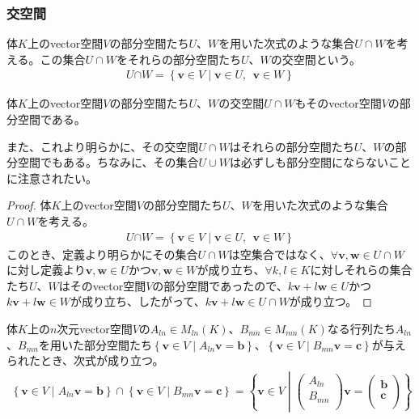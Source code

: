 \documentclass[dvipdfmx]{jsarticle}
\begin{document}
\subsubsection{交空間}%
\begin{dfn}
体$K$上のvector空間$V$の部分空間たち$U$、$W$を用いた次式のような集合$U \cap W$を考える。この集合$U \cap W$をそれらの部分空間たち$U$、$W$の交空間という。
\begin{align*}
U\text{∩}W = \left\{ \mathbf{v} \in V \middle| \mathbf{v} \in U,\ \ \mathbf{v} \in W \right\}
\end{align*}
\end{dfn}
\begin{thm}\label{2.1.9.3}
体$K$上のvector空間$V$の部分空間たち$U$、$W$の交空間$U \cap W$もそのvector空間$V$の部分空間である。
\end{thm}\par
また、これより明らかに、その交空間$U \cap W$はそれらの部分空間たち$U$、$W$の部分空間でもある。ちなみに、その集合$U \cup W$は必ずしも部分空間にならないことに注意されたい。
\begin{proof}
体$K$上のvector空間$V$の部分空間たち$U$、$W$を用いた次式のような集合$U \cap W$を考える。
\begin{align*}
U\text{∩}W = \left\{ \mathbf{v} \in V \middle| \mathbf{v} \in U,\ \ \mathbf{v} \in W \right\}
\end{align*}
このとき、定義より明らかにその集合$U \cap W$は空集合ではなく、$\forall\mathbf{v},\mathbf{w} \in U \cap W$に対し定義より$\mathbf{v},\mathbf{w} \in U$かつ$\mathbf{v},\mathbf{w} \in W$が成り立ち、$\forall k,l \in K$に対しそれらの集合たち$U$、$W$はそのvector空間$V$の部分空間であったので、$k\mathbf{v} + l\mathbf{w} \in U$かつ$k\mathbf{v} + l\mathbf{w} \in W$が成り立ち、したがって、$k\mathbf{v} + l\mathbf{w} \in U \cap W$が成り立つ。
\end{proof}
\begin{thm}\label{2.1.9.4}
体$K$上の$n$次元vector空間$V$の$A_{ln} \in M_{ln}(K)$、$B_{mn} \in M_{mn}(K)$なる行列たち$A_{ln}$、$B_{mn}$を用いた部分空間たち$\left\{ \mathbf{v} \in V \middle| A_{ln}\mathbf{v} = \mathbf{b} \right\}$、$\left\{ \mathbf{v} \in V \middle| B_{mn}\mathbf{v} = \mathbf{c} \right\}$が与えられたとき、次式が成り立つ。
\begin{align*}
\left\{ \mathbf{v} \in V \middle| A_{ln}\mathbf{v} = \mathbf{b} \right\} \cap \left\{ \mathbf{v} \in V \middle| B_{mn}\mathbf{v} = \mathbf{c} \right\} = \left\{ \mathbf{v} \in V \middle| \begin{pmatrix}
A_{ln} \\
B_{mn} \\
\end{pmatrix}\mathbf{v} = \begin{pmatrix}
\mathbf{b} \\
\mathbf{c} \\
\end{pmatrix} \right\}
\end{align*}
\end{thm}
\end{document}
